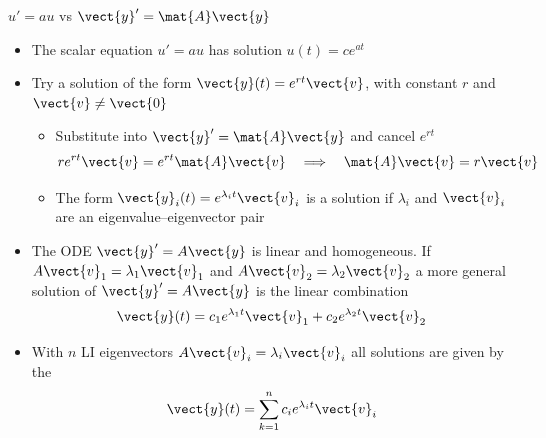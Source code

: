 \begin{frame}{$u'=a u$ \quad vs \quad $\vect{y}'=\mat{A}\vect{y}$}
\begin{itemize}
  \item The scalar equation $u'=au$ has solution $u(t)=ce^{at}$
  \item Try a solution of the form $\vect{y}(t)=e^{rt}\vect{v}$, with constant $r$ and $\vect{v}\ne\vect{0}$
  \begin{itemize}
    \item Substitute into $\vect{y}'=\mat{A}\vect{y}$ and cancel $e^{rt}$
    \[
      re^{rt}\vect{v}=e^{rt}\mat{A}\vect{v}
      \quad\Longrightarrow\quad
      \mat{A}\vect{v}=r\vect{v}
    \]
    \item The form $\vect{y}_i(t)=e^{\lambda_i t}\vect{v}_i$ is a solution if $\lambda_i$ and $\vect{v}_i$ are an eigenvalue--eigenvector pair
  \end{itemize}
  \item The ODE $\vect{y}'= A \vect{y}$ is linear and homogeneous.
  If 
  $A\vect{v}_1 = \lambda_1 \vect{v}_1$ and 
  $A\vect{v}_2 = \lambda_2 \vect{v}_2$ 
  a more general solution of $\vect{y}'= A \vect{y}$ is the linear combination 
  \[
    \vect{y}(t)=c_1e^{\lambda_1t}\vect{v}_1+c_2e^{\lambda_2t}\vect{v}_2
  \]
  \item With $n$ LI eigenvectors 
  $A\vect{v}_i = \lambda_i \vect{v}_i$ 
  all solutions are given by the    
  \[
  \vect{y}(t)= \sum_{k=1}^n c_i e^{\lambda_i t}\vect{v}_i
  \]
\end{itemize}
\end{frame}
